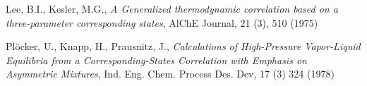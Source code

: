 \documentclass[english]{../thermomemo/thermomemo}
\numberwithin{equation}{section}
\begin{document}
\begin{thebibliography}{9}
  
	Lee, B.I., Kesler, M.G., \textit{A Generalized thermodynamic correlation based on a three-parameter corresponding states}, AlChE Journal, 21 (3), 510 (1975)

	Plöcker, U., Knapp, H., Prausnitz, J., \textit{Calculations of High-Pressure Vapor-Liquid Equilibria from a Corresponding-States Correlation with Emphasis on Asymmetric Mixtures}, Ind. Eng. Chem. Process Des. Dev, 17 (3) 324 (1978)
	

\end{thebibliography}
\end{document}
